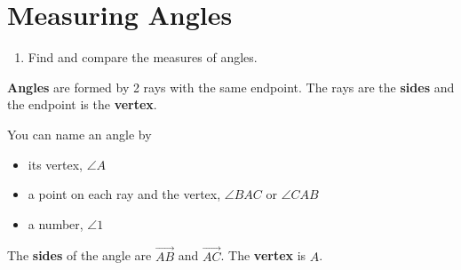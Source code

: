 \documentclass{article}
\begin{document}
\section*{Measuring Angles}

\begin{tcolorbox}[colframe=orange!70!white, coltitle=black, title=\textbf{Today I Can}]
\begin{enumerate}
    \item Find and compare the measures of angles.
\end{enumerate}
\end{tcolorbox}

\begin{tcolorbox}[
colframe=black!20!white, 
opacitybacktitle=0.1,
coltitle=black, title=\textbf{Angles}]
\textbf{Angles} are formed by 2 rays with the same endpoint. The rays are the \textbf{sides} and the endpoint is the \textbf{vertex}.
\end{tcolorbox}


\vspace{0.25in}

\begin{minipage}{0.55\textwidth}
You can name an angle by
\begin{itemize}
    \item its vertex, $\angle A$
    \item a point on each ray and the vertex, $\angle BAC$ or $\angle CAB$
    \item a number, $\angle 1$
\end{itemize}
\end{minipage}
\hspace{0.25in}
\begin{minipage}{0.4\textwidth}
\end{minipage}
\vspace{0.25in}

The \textbf{sides} of the angle are $\overrightarrow{AB}$ and $\overrightarrow{AC}$. The \textbf{vertex} is $A$.
\newline\\
\end{document}
